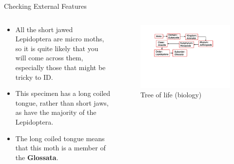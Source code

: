 \documentclass[
  ignorenonframetext,
]{beamer}
\providecommand{\tightlist}{%
  \setlength{\itemsep}{0pt}\setlength{\parskip}{0pt}}
\begin{document}
\begin{frame}{Checking External Features}
\protect\hypertarget{checking-external-features}{}
\begin{columns}[T]
\begin{column}{0.5\textwidth}
\begin{itemize}
\tightlist
\item
  All the short jawed Lepidoptera are micro moths, so it is quite likely
  that you will come across them, especially those that might be tricky
  to ID.
\item
  This specimen has a long coiled tongue, rather than short jaws, as
  have the majority of the Lepidoptera.
\item
  The long coiled tongue means that this moth is a member of the
  \textbf{Glossata}.
\end{itemize}
\end{column}

\begin{column}{0.5\textwidth}
\begin{figure}
\centering
\includegraphics{./images/suborder.jpg}
\caption{Tree of life (biology)}
\end{figure}
\end{column}
\end{columns}
\end{frame}
\end{document}
